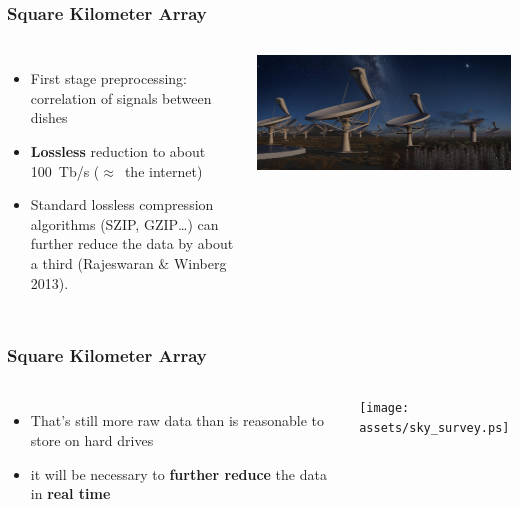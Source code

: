 \documentclass[10pt, compress]{beamer}
\begin{document}
\begin{frame}[fragile]
    \frametitle{Square Kilometer Array}
    \begin{columns}
            \begin{itemize}
                \item First stage preprocessing: correlation of signals between dishes
                \item \textbf{Lossless} reduction to about 100~Tb/s ($\approx$~the internet)
                \item Standard lossless compression algorithms (SZIP, GZIP…) can further reduce the data by about a third (Rajeswaran \& Winberg 2013).
            \end{itemize}
            \vspace{.01cm}
            \includegraphics[height=\textheight]{assets/skaall_night.jpg}
    \end{columns}
\end{frame}
\begin{frame}[fragile]
    \frametitle{Square Kilometer Array}
    \begin{columns}
            \begin{itemize}
                \item That's still more raw data than is reasonable to store on hard drives
                \item it will be necessary to \textbf{further reduce} the data in \textbf{real time}
            \end{itemize}
            \vspace{.01cm}
            \centering
            \texttt{[image: assets/sky\_survey.ps]}
    \end{columns}
\end{frame}
\end{document}
